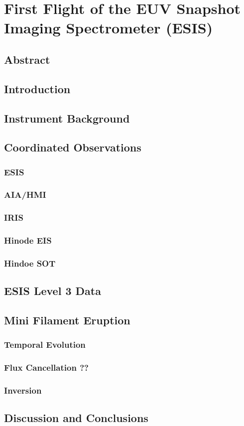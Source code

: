 \chapter{First Flight of the EUV Snapshot Imaging Spectrometer (ESIS)}

\section{Abstract}

\section{Introduction}

\section{Instrument Background}

\section{Coordinated Observations}
\subsection{ESIS}
\subsection{AIA/HMI}
\subsection{IRIS}
\subsection{Hinode EIS}
\subsection{Hindoe SOT}

\section{ESIS Level 3 Data}


\section{Mini Filament Eruption}
\subsection{Temporal Evolution}
\subsection{Flux Cancellation ??}
\subsection{Inversion}



\section{Discussion and Conclusions}